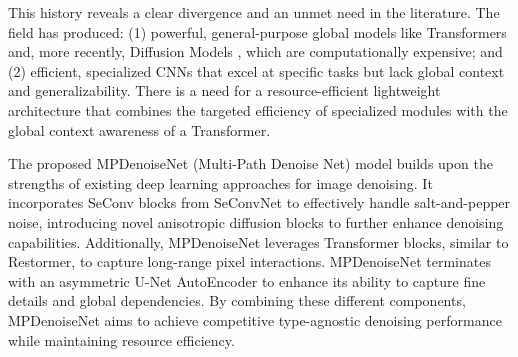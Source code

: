 This history reveals a clear divergence and an unmet need in the literature. The field has produced: (1) powerful, general-purpose global models like Transformers and, more recently, Diffusion Models \cite{zhu2023}, which are computationally expensive; and (2) efficient, specialized CNNs that excel at specific tasks but lack global context and generalizability. There is a need for a resource-efficient lightweight architecture that combines the targeted efficiency of specialized modules with the global context awareness of a Transformer.

The proposed MPDenoiseNet (Multi-Path Denoise Net) model builds upon the strengths of existing deep learning approaches for image denoising. It incorporates SeConv blocks from SeConvNet to effectively handle salt-and-pepper noise, introducing novel anisotropic diffusion blocks to further enhance denoising capabilities. Additionally, MPDenoiseNet leverages Transformer blocks, similar to Restormer, to capture long-range pixel interactions. MPDenoiseNet terminates with an asymmetric U-Net AutoEncoder to enhance its ability to capture fine details and global dependencies. By combining these different components, MPDenoiseNet aims to achieve competitive type-agnostic denoising performance while maintaining resource efficiency.